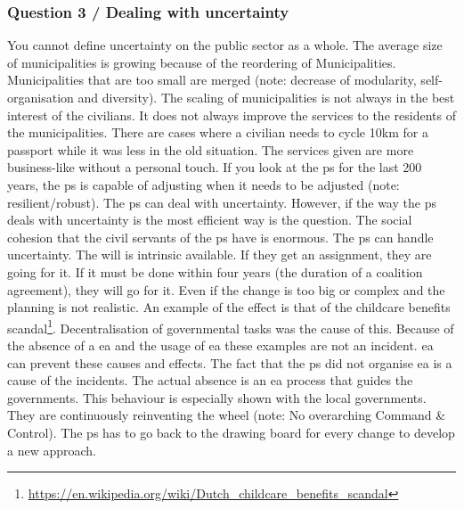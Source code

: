 \subsubsection{Question 3 / Dealing with uncertainty}
You cannot define uncertainty on the public sector as a whole. The average size of municipalities is growing because of the reordering of Municipalities. Municipalities that are too small are merged (note: decrease of modularity, self-organisation and diversity). The scaling of municipalities is not always in the best interest of the civilians. It does not always improve the services to the residents of the municipalities. There are cases where a civilian needs to cycle 10km for a passport while it was less in the old situation. The services given are more business-like without a personal touch. If you look at the \gls{ps} for the last 200 years, the \gls{ps} is capable of adjusting when it needs to be adjusted (note: resilient/robust). The \gls{ps} can deal with uncertainty. However, if the way the \gls{ps} deals with uncertainty is the most efficient way is the question. The social cohesion that the civil servants of the \gls{ps} have is enormous. The \gls{ps} can handle uncertainty. The will is intrinsic available. If they get an assignment, they are going for it. If it must be done within four years (the duration of a coalition agreement), they will go for it. Even if the change is too big or complex and the planning is not realistic.
An example of the effect is that of the childcare benefits scandal\footnote{\url{https://en.wikipedia.org/wiki/Dutch_childcare_benefits_scandal}}. Decentralisation of governmental tasks was the cause of this. Because of the absence of a \acrshort{ea} and the usage of \acrshort{ea} these examples are not an incident. \acrshort{ea} can prevent these causes and effects. The fact that the \gls{ps} did not organise \acrshort{ea} is a cause of the incidents. The actual absence is an \acrshort{ea} process that guides the governments. This behaviour is especially shown with the local governments. They are continuously reinventing the wheel (note: No overarching Command \& Control). The \gls{ps} has to go back to the drawing board for every change to develop a new approach.
